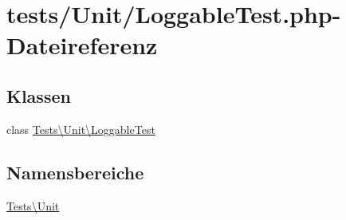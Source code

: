 \hypertarget{LoggableTest_8php}{}\section{tests/\+Unit/\+Loggable\+Test.php-\/\+Dateireferenz}
\label{LoggableTest_8php}
\subsection*{Klassen}
\begin{DoxyCompactItemize}
\item 
class \hyperlink{classTests_1_1Unit_1_1LoggableTest}{Tests\textbackslash{}\+Unit\textbackslash{}\+Loggable\+Test}
\end{DoxyCompactItemize}
\subsection*{Namensbereiche}
\begin{DoxyCompactItemize}
\item 
 \hyperlink{namespaceTests_1_1Unit}{Tests\textbackslash{}\+Unit}
\end{DoxyCompactItemize}
